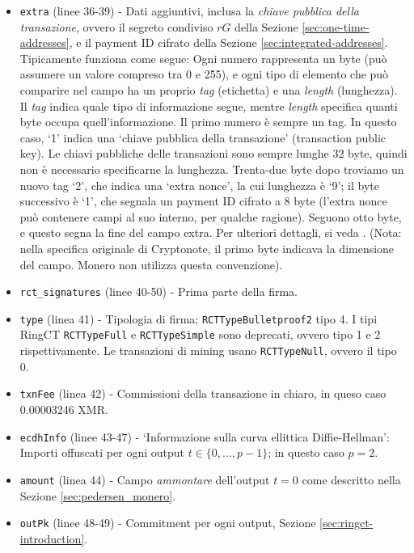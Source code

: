 \begin{appendices}
\begin{itemize}
	\item {\tt extra} (linee 36-39) - Dati aggiuntivi, inclusa la {\em chiave pubblica della transazione}, ovvero il segreto condiviso $r G$ della Sezione  \ref{sec:one-time-addresses}, e il payment ID cifrato della Sezione \ref{sec:integrated-addresses}. Tipicamente funziona come segue: Ogni numero rappresenta un byte (può assumere un valore compreso tra 0 e 255), e ogni tipo di elemento che può comparire nel campo ha un proprio \emph{tag} (etichetta) e una \emph{length} (lunghezza). Il \emph{tag} indica quale tipo di informazione segue, mentre \emph{length} specifica quanti byte occupa quell'informazione. Il primo numero è sempre un tag. In questo caso, `1' indica una `chiave pubblica della transazione' (transaction public key). Le chiavi pubbliche delle transazioni sono sempre lunghe 32 byte, quindi non è necessario specificarne la lunghezza. Trenta-due byte dopo troviamo un nuovo tag `2', che indica una `extra nonce', la cui lunghezza è `9'; il byte successivo è `1', che segnala un payment ID cifrato a 8 byte (l’extra nonce può contenere campi al suo interno, per qualche ragione). Seguono otto byte, e questo segna la fine del campo extra. Per ulteriori dettagli, si veda \cite{extra-field-stackexchange}. (Nota: nella specifica originale di Cryptonote, il primo byte indicava la dimensione del campo. Monero non utilizza questa convenzione). \cite{tx-extra-field}
	\item {\tt rct\_signatures} (linee 40-50) - Prima parte della firma.
	\item {\tt type} (linea 41) - Tipologia di firma; {\tt RCTTypeBulletproof2} tipo 4. I tipi RingCT {\tt RCTTypeFull} e {\tt RCTTypeSimple} sono deprecati, ovvero tipo 1 e 2 rispettivamente. Le transazioni di mining usano {\tt RCTTypeNull}, ovvero il tipo 0.
	\item {\tt txnFee} (linea 42) - Commissioni della transazione in chiaro, in queso caso 0.00003246 XMR.
	\item {\tt ecdhInfo} (linee 43-47) - ‘Informazione sulla curva ellittica Diffie-Hellman’: Importi offuscati per ogni output $t \in \{0, ..., p-1\}$; in questo caso $p = 2$.
    \item {\tt amount} (linea 44) - Campo {\sl ammontare} dell'output $t = 0$ come descritto nella Sezione \ref{sec:pedersen_monero}.
    \item {\tt outPk} (linee 48-49) - Commitment per ogni output, Sezione \ref{sec:ringct-introduction}.


\end{itemize}
\end{appendices}
